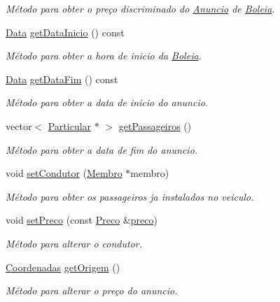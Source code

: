 \begin{DoxyCompactItemize}
\begin{DoxyCompactList}\small\item\em Método para obter o preço discriminado do \hyperlink{class_anuncio}{Anuncio} de \hyperlink{class_boleia}{Boleia}. \end{DoxyCompactList}\item 
\hyperlink{class_data}{Data} \hyperlink{class_anuncio_a7d85e1cf72f81a767ca666cb17ef88ac}{get\+Data\+Inicio} () const 
\begin{DoxyCompactList}\small\item\em Método para obter a hora de inicio da \hyperlink{class_boleia}{Boleia}. \end{DoxyCompactList}\item 
\hyperlink{class_data}{Data} \hyperlink{class_anuncio_a2e5adcc932f13615ab7bfc1e69964d4e}{get\+Data\+Fim} () const 
\begin{DoxyCompactList}\small\item\em Método para obter a data de inicio do anuncio. \end{DoxyCompactList}\item 
vector$<$ \hyperlink{class_particular}{Particular} $\ast$ $>$ \hyperlink{class_anuncio_a5dcd647bd001e6ccced77ffc213434f6}{get\+Passageiros} ()
\begin{DoxyCompactList}\small\item\em Método para obter a data de fim do anuncio. \end{DoxyCompactList}\item 
void \hyperlink{class_anuncio_aaede8d69a67be68cd3d8bfa0935f068b}{set\+Condutor} (\hyperlink{class_membro}{Membro} $\ast$membro)
\begin{DoxyCompactList}\small\item\em Método para obter os passageiros ja instalados no veiculo. \end{DoxyCompactList}\item 
void \hyperlink{class_anuncio_a2d6b1de1396b3ac962931dea7f50af3a}{set\+Preco} (const \hyperlink{class_preco}{Preco} \&\hyperlink{class_anuncio_aa780fd8e07586a3af117fd20593fb1b4}{preco})
\begin{DoxyCompactList}\small\item\em Método para alterar o condutor. \end{DoxyCompactList}\item 
\hyperlink{class_coordenadas}{Coordenadas} \hyperlink{class_anuncio_ac0f21112a31b6812a3128d9cac198c42}{get\+Origem} ()
\begin{DoxyCompactList}\small\item\em Método para alterar o preço do anuncio. \end{DoxyCompactList}\item 

\end{DoxyCompactItemize}

